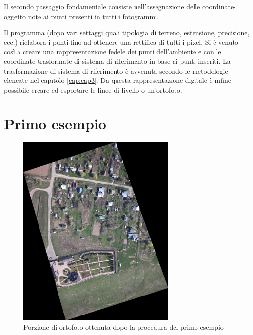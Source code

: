 Il secondo passaggio fondamentale consiste nell'assegnazione delle coordinate-oggetto note ai punti presenti in tutti i fotogrammi.

Il programma (dopo vari settaggi quali tipologia di terreno, estensione, precisione, ecc.) rielabora i punti fino ad ottenere una rettifica di tutti i pixel.
Si è venuto così a creare una rappresentazione fedele dei punti dell'ambiente e con le coordinate trasformate di sistema di riferimento  in base ai punti inseriti.
La trasformazione di sistema di riferimento è avvenuta secondo le metodologie elencate nel capitolo \ref{cap:cap3}.
Da questa rappresentazione digitale è infine  possibile creare ed esportare le linee di livello o un'ortofoto.
\section{Primo esempio}
\begin{figure}[H]
\centering
\includegraphics[trim= 3cm 3cm 3cm 3cm,clip,width=0.7\textwidth]{Img/Orto1.pdf}
\caption{Porzione di ortofoto ottenuta dopo la procedura del primo esempio}
\end{figure}
